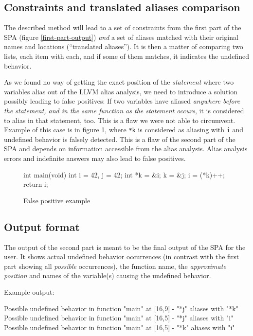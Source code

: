 \subsection{Constraints and translated aliases comparison}\label{flaw}
The described method will lead to a set of constraints from the first part of the SPA (figure \ref{first-part-output}) \emph{and} a set of aliases matched with their original names and locations (``translated aliases''). It is then a matter of comparing two lists, each item with each, and if some of them matches, it indicates the undefined behavior.

As we found no way of getting the exact position of the \emph{statement} where two variables alias out of the LLVM alias analysis, we need to introduce a solution possibly leading to false positives: If two variables have aliased \emph{anywhere before the statement, and in the same function as the statement occurs}, it is considered to alias in that statement, too. This is a flaw we were not able to circumvent. Example of this case is in figure \ref{example-alias-before}, where \verb|*k| is considered as aliasing with \verb|i| and undefined behavior is falsely detected. This is a flaw of the second part of the SPA and depends on information accessible from the alias analysis. Alias analysis errors and indefinite answers may also lead to false positives.
\begin{figure}
\caption{False positive example}
\label{example-alias-before}
\begin{code}
int main(void){
  int i = 42, j = 42;
  int *k = &i;
  k = &j;
  i = (*k)++;
  return i;
}
\end{code}
\end{figure}
\subsection{Output format}
The output of the second part is meant to be the final output of the SPA for the user. It shows actual undefined behavior occurrences (in contrast with the first part showing all \emph{possible} occurrences), the function name, the \emph{approximate position} and names of the variable(s) causing the undefined behavior.

Example output:
\\\begin{code}
Possible undefined behavior in function "main" at [16,9] - "*j" aliases with "*k"
Possible undefined behavior in function "main" at [16,5] - "*j" aliases with "i"
Possible undefined behavior in function "main" at [16,5] - "*k" aliases with "i"
\end{code}

